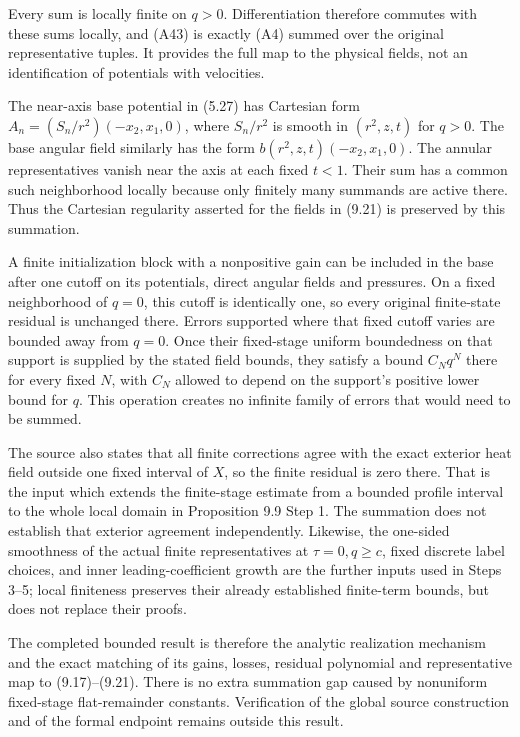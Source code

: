 \documentclass[10pt,a4paper]{article}
\begin{document}
Every sum is locally finite on \(q>0\). Differentiation therefore commutes with these sums locally, and (A43) is exactly (A4) summed over the original representative tuples. It provides the full map to the physical fields, not an identification of potentials with velocities.

The near-axis base potential in (5.27) has Cartesian form \(A_n=(S_n/r^2)(-x_2,x_1,0)\), where \(S_n/r^2\) is smooth in \((r^2,z,t)\) for \(q>0\). The base angular field similarly has the form \(b(r^2,z,t)(-x_2,x_1,0)\). The annular representatives vanish near the axis at each fixed \(t<1\). Their sum has a common such neighborhood locally because only finitely many summands are active there. Thus the Cartesian regularity asserted for the fields in (9.21) is preserved by this summation.

A finite initialization block with a nonpositive gain can be included in the base after one cutoff on its potentials, direct angular fields and pressures. On a fixed neighborhood of \(q=0\), this cutoff is identically one, so every original finite-state residual is unchanged there. Errors supported where that fixed cutoff varies are bounded away from \(q=0\). Once their fixed-stage uniform boundedness on that support is supplied by the stated field bounds, they satisfy a bound \(C_Nq^N\) there for every fixed \(N\), with \(C_N\) allowed to depend on the support's positive lower bound for \(q\). This operation creates no infinite family of errors that would need to be summed.

The source also states that all finite corrections agree with the exact exterior heat field outside one fixed interval of \(X\), so the finite residual is zero there. That is the input which extends the finite-stage estimate from a bounded profile interval to the whole local domain in Proposition 9.9 Step 1. The summation does not establish that exterior agreement independently. Likewise, the one-sided smoothness of the actual finite representatives at \(\tau=0,q\ge c\), fixed discrete label choices, and inner leading-coefficient growth are the further inputs used in Steps 3--5; local finiteness preserves their already established finite-term bounds, but does not replace their proofs.

The completed bounded result is therefore the analytic realization mechanism and the exact matching of its gains, losses, residual polynomial and representative map to (9.17)--(9.21). There is no extra summation gap caused by nonuniform fixed-stage flat-remainder constants. Verification of the global source construction and of the formal endpoint remains outside this result.
\end{document}
